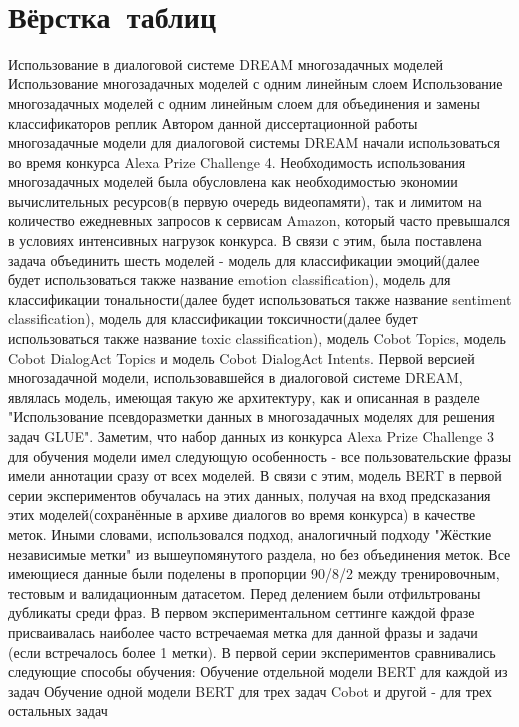   \chapter{Вёрстка таблиц}\label{ch:ch3} 
  Использование в диалоговой системе DREAM многозадачных моделей
Использование многозадачных моделей с одним линейным слоем 
Использование многозадачных моделей с одним линейным слоем для объединения и замены классификаторов реплик
Автором данной диссертационной работы многозадачные модели для диалоговой системы DREAM начали использоваться во время конкурса Alexa Prize Challenge 4. Необходимость использования многозадачных моделей была обусловлена как необходимостью экономии вычислительных ресурсов(в первую очередь видеопамяти), так и лимитом на количество ежедневных запросов к сервисам Amazon, который часто превышался в условиях интенсивных нагрузок конкурса. В связи с этим, была поставлена задача объединить шесть моделей - модель для классификации эмоций(далее будет использоваться также название emotion classification), модель для классификации тональности(далее будет использоваться также название sentiment classification), модель для классификации токсичности(далее будет использоваться также название toxic classification), модель Cobot Topics, модель Cobot DialogAct Topics и модель Cobot DialogAct Intents. 
Первой версией многозадачной модели, использовавшейся в диалоговой системе DREAM, являлась модель, имеющая такую же архитектуру, как и описанная в разделе "Использование псевдоразметки данных в многозадачных моделях для решения задач GLUE". 
 Заметим, что набор данных из конкурса Alexa Prize Challenge 3 для обучения модели имел следующую особенность - все пользовательские фразы имели аннотации сразу от всех моделей. В связи с этим, модель BERT в первой серии экспериментов обучалась на этих данных, получая на вход предсказания этих моделей(сохранённые в архиве диалогов во время конкурса) в качестве меток. Иными словами, использовался подход, аналогичный подходу "Жёсткие независимые метки" из вышеупомянутого раздела, но без объединения меток. 
Все имеющиеся данные были поделены в пропорции 90/8/2 между тренировочным, тестовым и валидационным датасетом. Перед делением были отфильтрованы дубликаты среди фраз. В первом экспериментальном сеттинге каждой фразе присваивалась наиболее часто встречаемая метка для данной фразы и задачи (если встречалось более 1 метки). 
В первой серии экспериментов сравнивались следующие способы обучения:
Обучение отдельной модели BERT для каждой из задач
Обучение одной модели BERT для трех задач Cobot и другой - для трех остальных задач

